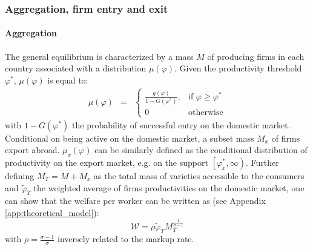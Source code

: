 \documentclass[a4paper,11pt]{article}
\begin{document}
\subsubsection{Aggregation, firm entry and exit}

\paragraph{Aggregation} The general equilibrium is characterized by a mass $M$ of producing firms in each country associated with a distribution $\mu(\varphi)$. Given the productivity threshold $\varphi^\ast$, $\mu(\varphi)$ is equal to:
\begin{eqnarray}
\mu(\varphi) &=& \left\{
\begin{array}{ll}
\frac{g(\varphi)}{1-G(\varphi^\ast)}, & \text{if } \varphi\geq \varphi^\ast  \\
0 & \text{otherwise}
\end{array}
\right.  \label{eq:muofphi}
\end{eqnarray}
\noindent with $1-G(\varphi^\ast)$ the probability of successful entry on the domestic market. Conditional on being active on the domestic market, a subset mass $M_x$ of firms export abroad. $\mu_x(\varphi)$ can be similarly defined as the conditional distribution of productivity on the export market, e.g. on the support $\left[ \varphi^\ast_x,\infty\right)$.
Further defining $M_T = M+M_x$ as the total mass of varieties accessible to the consumers and $\widetilde{\varphi}_T$ the weighted average of firms productivities on the domestic market, one can show that the welfare per worker can be written as (see Appendix \ref{app:theoretical_model}):
\begin{equation}
\mathcal{W} = \rho \widetilde{\varphi}_T M_T^{\frac{1}{\sigma-1}} \label{eq:Welfare}
\end{equation}
\noindent with $\rho =  \frac{\sigma-1}{\sigma}$ inversely related to the markup rate.
\end{document}
